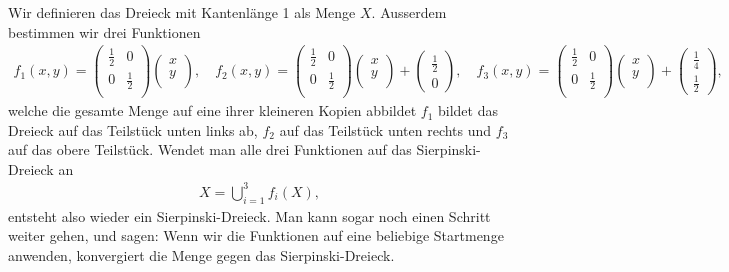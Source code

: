 Wir definieren das Dreieck mit Kantenlänge 1 als Menge $X$.
Ausserdem bestimmen wir drei Funktionen
\begin{align*}
	f_1(x,y)
	= 
	\begin{pmatrix}
		\frac{1}{2} & 0 \\
		0 & \frac{1}{2} \\
	\end{pmatrix}
	\begin{pmatrix}
		x\\
		y\\
	\end{pmatrix} 
	,\quad
	f_2(x,y)
	= 
	\begin{pmatrix}
		\frac{1}{2} & 0 \\
		0 & \frac{1}{2} \\
	\end{pmatrix}
	\begin{pmatrix}
		x\\
		y\\
	\end{pmatrix} 
	+
	\begin{pmatrix}
		\frac{1}{2} \\
		0
	\end{pmatrix}
	, \quad
	f_3(x,y)
	= 
	\begin{pmatrix}
		\frac{1}{2} & 0 \\
		0 & \frac{1}{2} \\
	\end{pmatrix}
	\begin{pmatrix}
		x\\
		y\\
	\end{pmatrix} 
	+
	\begin{pmatrix}
		\frac{1}{4} \\
		\frac{1}{2}
	\end{pmatrix},
\end{align*}
welche die gesamte Menge auf eine ihrer kleineren Kopien abbildet
$f_1$ bildet das Dreieck auf das Teilstück unten links ab, $f_2$ auf das Teilstück unten rechts und $f_3$ auf das obere Teilstück.
Wendet man alle drei Funktionen auf das Sierpinski-Dreieck an
\begin{align*}
	X = \bigcup\limits_{i = 1}^{3} f_i(X),
\end{align*}
entsteht also wieder ein Sierpinski-Dreieck.
Man kann sogar noch einen Schritt weiter gehen, und sagen: Wenn wir die Funktionen auf eine beliebige Startmenge anwenden, konvergiert die Menge gegen das Sierpinski-Dreieck.
